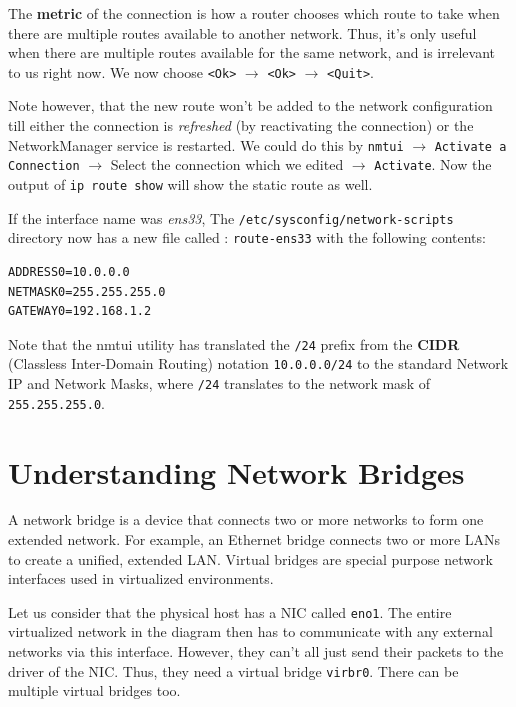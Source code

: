 The \textbf{metric} of the connection is how a router chooses which route to take when there are multiple routes available to another network. Thus, it's only useful when there are multiple routes available for the same network, and is irrelevant to us right now. We now choose \verb|<Ok>| $\rightarrow$ \verb|<Ok>| $\rightarrow$ \verb|<Quit>|. 

Note however, that the new route won't be added to the network configuration till either the connection is \textit{refreshed} (by reactivating the connection) or the NetworkManager service is restarted. We could do this by \verb|nmtui| $\rightarrow$ \verb|Activate a Connection| $\rightarrow$ Select the connection which we edited $\rightarrow$ \verb|Activate|. Now the output of \verb|ip route show| will show the static route as well. 

If the interface name was \textit{ens33}, The \verb|/etc/sysconfig/network-scripts| directory now has a new file called : \verb|route-ens33| with the following contents:

\vspace{-15pt}
\begin{verbatim}
ADDRESS0=10.0.0.0
NETMASK0=255.255.255.0
GATEWAY0=192.168.1.2
\end{verbatim}
\vspace{-10pt}	

\noindent
Note that the nmtui utility has translated the \verb|/24| prefix from the \textbf{CIDR} (Classless Inter-Domain Routing) notation \verb|10.0.0.0/24| to the standard Network IP and Network Masks, where \verb|/24| translates to the network mask of \verb|255.255.255.0|. 

	\section{Understanding Network Bridges}
A network bridge is a device that connects two or more networks to form one extended network. For example, an Ethernet bridge connects two or more LANs to create a unified, extended LAN. Virtual bridges are special purpose network interfaces used in virtualized environments. 

Let us consider that the physical host has a NIC called \verb|eno1|. The entire virtualized network in the diagram then has to communicate with any external networks via this interface. However, they can't all just send their packets to the driver of the NIC. Thus, they need a virtual bridge \verb|virbr0|. There can be multiple virtual bridges too. 

